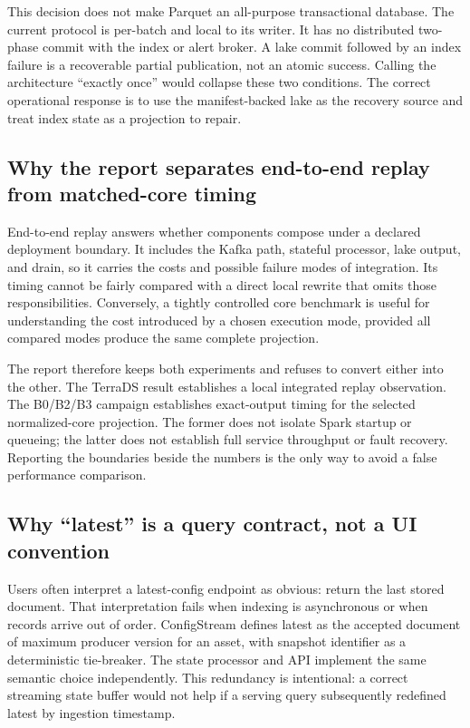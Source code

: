This decision does not make Parquet an all-purpose transactional database. The current protocol is per-batch and local to its writer. It has no distributed two-phase commit with the index or alert broker. A lake commit followed by an index failure is a recoverable partial publication, not an atomic success. Calling the architecture ``exactly once'' would collapse these two conditions. The correct operational response is to use the manifest-backed lake as the recovery source and treat index state as a projection to repair.

\subsection{Why the report separates end-to-end replay from matched-core timing}

End-to-end replay answers whether components compose under a declared deployment boundary. It includes the Kafka path, stateful processor, lake output, and drain, so it carries the costs and possible failure modes of integration. Its timing cannot be fairly compared with a direct local rewrite that omits those responsibilities. Conversely, a tightly controlled core benchmark is useful for understanding the cost introduced by a chosen execution mode, provided all compared modes produce the same complete projection.

The report therefore keeps both experiments and refuses to convert either into the other. The TerraDS result establishes a local integrated replay observation. The B0/B2/B3 campaign establishes exact-output timing for the selected normalized-core projection. The former does not isolate Spark startup or queueing; the latter does not establish full service throughput or fault recovery. Reporting the boundaries beside the numbers is the only way to avoid a false performance comparison.

\subsection{Why ``latest'' is a query contract, not a UI convention}

Users often interpret a latest-config endpoint as obvious: return the last stored document. That interpretation fails when indexing is asynchronous or when records arrive out of order. ConfigStream defines latest as the accepted document of maximum producer version for an asset, with snapshot identifier as a deterministic tie-breaker. The state processor and API implement the same semantic choice independently. This redundancy is intentional: a correct streaming state buffer would not help if a serving query subsequently redefined latest by ingestion timestamp.

